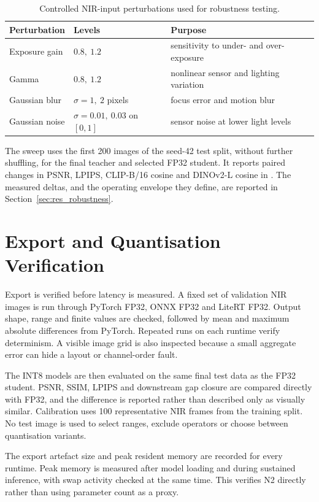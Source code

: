 \begin{table}[!htbp]
\centering
\footnotesize
\begin{tabular}{lll}
\hline
\textbf{Perturbation} & \textbf{Levels} & \textbf{Purpose} \\
\hline
Exposure gain & $0.8,\ 1.2$ & sensitivity to under- and over-exposure \\
Gamma & $0.8,\ 1.2$ & nonlinear sensor and lighting variation \\
Gaussian blur & $\sigma=1,\ 2$ pixels & focus error and motion blur \\
Gaussian noise & $\sigma=0.01,\ 0.03$ on $[0,1]$ & sensor noise at lower light levels \\
\hline
\end{tabular}
\caption{Controlled NIR-input perturbations used for robustness testing.}
\label{tab:robustness_tests}
\end{table}

The sweep uses the first 200 images of the seed-42 test split, without further shuffling, for the final teacher and selected FP32 student. It reports paired changes in PSNR, LPIPS, CLIP-B/16 cosine and DINOv2-L cosine in . The measured deltas, and the operating envelope they define, are reported in Section~\ref{sec:res_robustness}.

\section{Export and Quantisation Verification}
\label{sec:test_export}

Export is verified before latency is measured. A fixed set of validation NIR images is run through PyTorch FP32, ONNX FP32 and LiteRT FP32. Output shape, range and finite values are checked, followed by mean and maximum absolute differences from PyTorch. Repeated runs on each runtime verify determinism. A visible image grid is also inspected because a small aggregate error can hide a layout or channel-order fault.

The INT8 models are then evaluated on the same final test data as the FP32 student. PSNR, SSIM, LPIPS and downstream gap closure are compared directly with FP32, and the difference is reported rather than described only as visually similar. Calibration uses 100 representative NIR frames from the training split. No test image is used to select ranges, exclude operators or choose between quantisation variants.

The export artefact size and peak resident memory are recorded for every runtime. Peak memory is measured after model loading and during sustained inference, with swap activity checked at the same time. This verifies N2 directly rather than using parameter count as a proxy.


